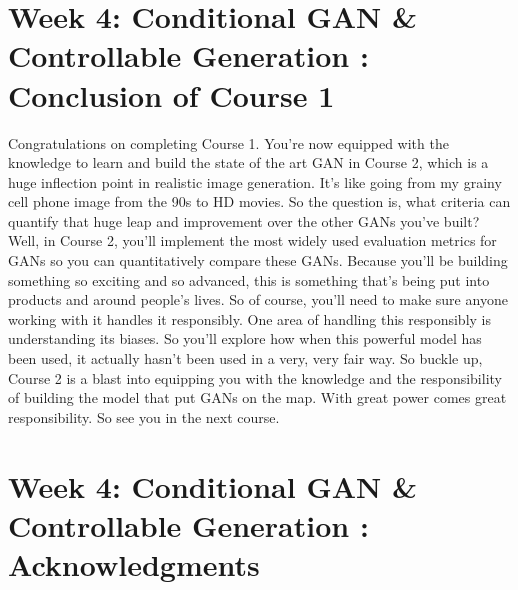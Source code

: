 \documentclass[11pt, onecolumn]{article}
\begin{document}
\section{Week 4: Conditional GAN \& Controllable Generation : Conclusion of Course 1}

Congratulations on completing Course 1.
You're now equipped with the knowledge to learn and
build the state of the art GAN in Course 2,
which is a huge inflection point
in realistic image generation.
It’s like going from my grainy cell phone image
from the 90s to HD movies.
So the question is, what criteria can quantify
that huge leap and improvement
over the other GANs you've built?
Well, in Course 2, you'll implement
the most widely used evaluation metrics for GANs
so you can quantitatively compare these GANs.
Because you'll be building something so
exciting and so advanced,
this is something that's being put into
products and around people's lives.
So of course, you'll need to make
sure anyone working with it handles it responsibly.
One area of handling this
responsibly is understanding its biases.
So you'll explore how
when this powerful model has been used,
it actually hasn't been used in a very, very fair way.
So buckle up, Course 2 is a blast into equipping you with
the knowledge and the responsibility
of building the model that put GANs on the map.
With great power comes great responsibility.
So see you in the next course. 

\section{Week 4: Conditional GAN \& Controllable Generation : Acknowledgments}
\end{document}
